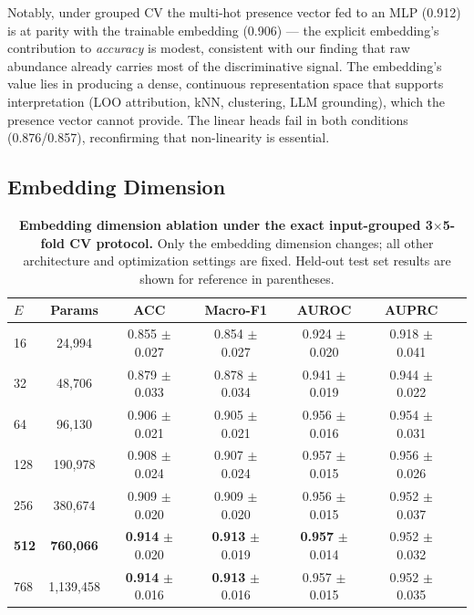 \documentclass[11pt,a4paper]{article}
\begin{document}
Notably, under grouped CV the multi-hot presence vector fed to an MLP (0.912) is at parity with the trainable embedding (0.906) --- the explicit embedding's contribution to \emph{accuracy} is modest, consistent with our finding that raw abundance already carries most of the discriminative signal. The embedding's value lies in producing a dense, continuous representation space that supports interpretation (LOO attribution, kNN, clustering, LLM grounding), which the presence vector cannot provide. The linear heads fail in both conditions (0.876/0.857), reconfirming that non-linearity is essential.

\subsection{Embedding Dimension}

\begin{table}[ht]
\centering
\caption{\textbf{Embedding dimension ablation under the exact input-grouped 3$\times$5-fold CV protocol.}
Only the embedding dimension changes; all other architecture and optimization settings are fixed.
Held-out test set results are shown for reference in parentheses.}
\label{tab:embedding}
\begin{tabular}{lcccccr}
\toprule
\textbf{$E$} & \textbf{Params} & \textbf{ACC} & \textbf{Macro-F1} & \textbf{AUROC} & \textbf{AUPRC} \\
\midrule
16  & 24,994 & 0.855 $\pm$ 0.027 & 0.854 $\pm$ 0.027 & 0.924 $\pm$ 0.020 & 0.918 $\pm$ 0.041 \\
32  & 48,706 & 0.879 $\pm$ 0.033 & 0.878 $\pm$ 0.034 & 0.941 $\pm$ 0.019 & 0.944 $\pm$ 0.022 \\
64  & 96,130 & 0.906 $\pm$ 0.021 & 0.905 $\pm$ 0.021 & 0.956 $\pm$ 0.016 & 0.954 $\pm$ 0.031 \\
128 & 190,978 & 0.908 $\pm$ 0.024 & 0.907 $\pm$ 0.024 & 0.957 $\pm$ 0.015 & 0.956 $\pm$ 0.026 \\
256 & 380,674 & 0.909 $\pm$ 0.020 & 0.909 $\pm$ 0.020 & 0.956 $\pm$ 0.015 & 0.952 $\pm$ 0.037 \\
\textbf{512} & \textbf{760,066} & \textbf{0.914} $\pm$ 0.020 & \textbf{0.913} $\pm$ 0.019 & \textbf{0.957} $\pm$ 0.014 & 0.952 $\pm$ 0.032 \\
768 & 1,139,458 & \textbf{0.914} $\pm$ 0.016 & \textbf{0.913} $\pm$ 0.016 & 0.957 $\pm$ 0.015 & 0.952 $\pm$ 0.035 \\
\bottomrule
\end{tabular}
\end{table}
\end{document}
